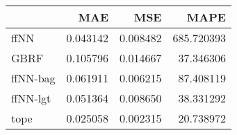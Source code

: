 \begin{tabular}{lrrr}
\toprule
{} &       MAE &       MSE &        MAPE \\
\midrule
ffNN     &  0.043142 &  0.008482 &  685.720393 \\
GBRF     &  0.105796 &  0.014667 &   37.346306 \\
ffNN-bag &  0.061911 &  0.006215 &   87.408119 \\
ffNN-lgt &  0.051364 &  0.008650 &   38.331292 \\
tope     &  0.025058 &  0.002315 &   20.738972 \\
\bottomrule
\end{tabular}
